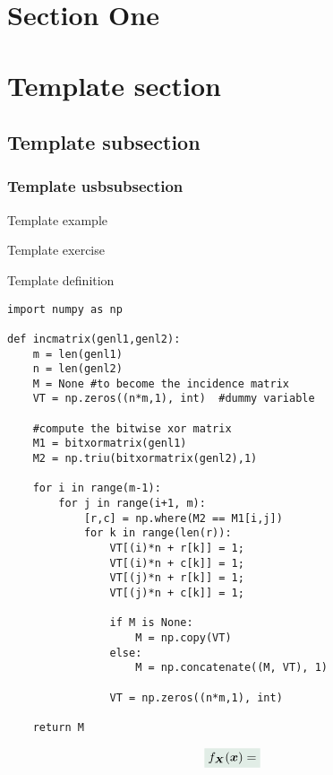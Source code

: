 \section{Section One}
%
\lipsum[2]
\section{Template section}
\lipsum[2]
\subsection{Template subsection}
\lipsum[1]
\subsubsection{Template usbsubsection}
\lipsum[1]
\begin{example}{Template example}
    \lipsum[2]
\end{example}
\lipsum[2]
\begin{exercise}{Template exercise}
    \lipsum[3]
\end{exercise}
\lipsum[2]
\begin{definition}{Template definition}
    \lipsum[4]
\end{definition}
\lipsum[2]
\begin{emphasizeb}
    \lipsum[5]
\end{emphasizeb}
\lipsum[2]
\begin{emphasizer}
    \lipsum[6]
\end{emphasizer}
\lipsum[2]

\begin{lstlisting}[caption=Template Python code.]
import numpy as np
    
def incmatrix(genl1,genl2):
    m = len(genl1)
    n = len(genl2)
    M = None #to become the incidence matrix
    VT = np.zeros((n*m,1), int)  #dummy variable
    
    #compute the bitwise xor matrix
    M1 = bitxormatrix(genl1)
    M2 = np.triu(bitxormatrix(genl2),1) 

    for i in range(m-1):
        for j in range(i+1, m):
            [r,c] = np.where(M2 == M1[i,j])
            for k in range(len(r)):
                VT[(i)*n + r[k]] = 1;
                VT[(i)*n + c[k]] = 1;
                VT[(j)*n + r[k]] = 1;
                VT[(j)*n + c[k]] = 1;
                
                if M is None:
                    M = np.copy(VT)
                else:
                    M = np.concatenate((M, VT), 1)
                
                VT = np.zeros((n*m,1), int)
    
    return M
\end{lstlisting}

\lipsum[1-4]

\begin{align}
    \highlight{f_{\bm{X}}(\bm{x})=}
\end{align}